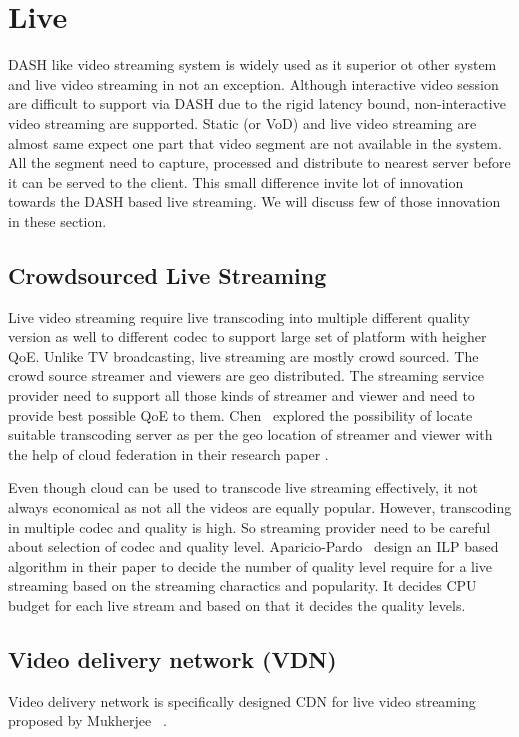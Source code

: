 
\section{Live}
DASH like video streaming system is widely used as it superior ot other system and live video streaming in not an exception. Although interactive video session are difficult to support via DASH due to the rigid latency bound, non-interactive video streaming are supported. Static (or VoD) and live video streaming are almost same expect one part that video segment are not available in the system. All the segment need to capture, processed and distribute to nearest server before it can be served to the client. This small difference invite lot of innovation towards the DASH based live streaming. We will discuss few of those innovation in these section.

\subsection{Crowdsourced Live Streaming}
Live video streaming require live transcoding into multiple different quality version as well to different codec to support large set of platform with heigher QoE. Unlike TV broadcasting, live streaming are mostly crowd sourced. The crowd source streamer and viewers are geo distributed. The streaming service provider need to support all those kinds of streamer and viewer and need to provide best possible QoE to them. Chen \etal\ explored the possibility of locate suitable transcoding server as per the geo location of streamer and viewer with the help of cloud federation in their research paper \cite{7218642}.

Even though cloud can be used to transcode live streaming effectively, it not always economical as not all the videos are equally popular. However, transcoding in multiple codec and quality is high. So streaming provider need to be careful about selection of codec and quality level. Aparicio-Pardo \etal\ design an ILP based algorithm in their paper \cite{10.1145/2713168.2713177} to decide the number of quality level require for a live streaming based on the streaming charactics and popularity. It decides CPU budget for each live stream and based on that it decides the quality levels.

\subsection{Video delivery network (VDN)}
Video delivery network is specifically designed CDN for live video streaming proposed by Mukherjee \etal\ \cite{10.1145/2785956.2787475}.  



